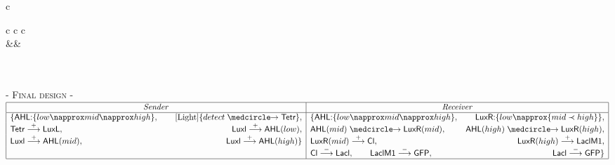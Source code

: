 \documentclass{eptcs}
\newcommand{\activate}[0]{\stackrel{+}{\reg}}
\newcommand{\inhibit}[0]{\stackrel{-}{\reg}}
\newcounter{ti}
\begin{document}
\begin{table}[ht]
\begin{sideways}
\begin{tabular}{c}
{\begin{array}[t]{c c c}
\DisplayProof
\\
&&\\
\end{array}
} \\ \\
\textsc{- Final design -}
\\
{\tiny
\footnotesize
$ \begin{array}{|l|l|}
\hline
\multicolumn{1}{|c|}{\mathit{Sender}}& \multicolumn{1}{c|}{\mathit{Receiver}}\\
\hline
\{\textsf{AHL:}\{low \napprox mid \napprox high \}, \qquad \context{\text{Light}}\{detect\cause\textsf{Tetr}\},
&\{\textsf{AHL:}\{low \napprox mid \napprox high \}, \qquad
\textsf{LuxR:}\{low \napprox \{mid \prec high\} \},\\
\textsf{Tetr}\activate\textsf{LuxL}, \hfill
\textsf{Luxl}\activate\textsf{AHL}(low),
& \textsf{AHL}(mid)\cause\textsf{LuxR}(mid),\hfill
 \textsf{AHL}(high)\cause\textsf{LuxR}(high),\\
\textsf{Luxl}\activate\textsf{AHL}(mid), \hfill
\textsf{Luxl}\activate\textsf{AHL}(high)\}
& \textsf{LuxR}(mid)\activate\textsf{Cl}, \hfill
\textsf{LuxR}(high)\activate\textsf{LaclM1},\\
& \textsf{Cl}\inhibit\textsf{Lacl},\qquad
\textsf{LaclM1}\inhibit\textsf{GFP}, \hfill
 \textsf{Lacl}\inhibit\textsf{GFP}\}\\
\hline
\end{array} $
}
\end{tabular}
\end{sideways} 
\vspace{-7ex}\caption{Complete band detector compilation.}
\label{tab:proof2}
\end{table}
\end{document}
